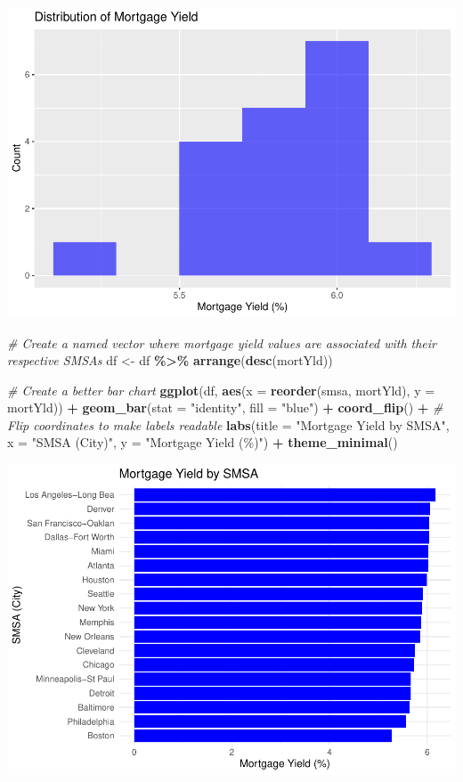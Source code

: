 \documentclass[
  12pt,
]{article}
\newenvironment{Shaded}{\begin{snugshade}}{\end{snugshade}}
\newcommand{\AttributeTok}[1]{\textcolor[rgb]{0.13,0.29,0.53}{#1}}
\newcommand{\CommentTok}[1]{\textcolor[rgb]{0.56,0.35,0.01}{\textit{#1}}}
\newcommand{\FunctionTok}[1]{\textcolor[rgb]{0.13,0.29,0.53}{\textbf{#1}}}
\newcommand{\NormalTok}[1]{#1}
\newcommand{\OtherTok}[1]{\textcolor[rgb]{0.56,0.35,0.01}{#1}}
\newcommand{\SpecialCharTok}[1]{\textcolor[rgb]{0.81,0.36,0.00}{\textbf{#1}}}
\newcommand{\StringTok}[1]{\textcolor[rgb]{0.31,0.60,0.02}{#1}}
\begin{document}
\includegraphics{report1_r1_files/figure-latex/unnamed-chunk-4-1.pdf}

\begin{Shaded}
\begin{Highlighting}[]
\CommentTok{\# Create a named vector where mortgage yield values are associated with their respective SMSAs}
\NormalTok{df }\OtherTok{\textless{}{-}}\NormalTok{ df }\SpecialCharTok{\%\textgreater{}\%} \FunctionTok{arrange}\NormalTok{(}\FunctionTok{desc}\NormalTok{(mortYld))  }

\CommentTok{\# Create a better bar chart}
\FunctionTok{ggplot}\NormalTok{(df, }\FunctionTok{aes}\NormalTok{(}\AttributeTok{x =} \FunctionTok{reorder}\NormalTok{(smsa, mortYld), }\AttributeTok{y =}\NormalTok{ mortYld)) }\SpecialCharTok{+} 
  \FunctionTok{geom\_bar}\NormalTok{(}\AttributeTok{stat =} \StringTok{"identity"}\NormalTok{, }\AttributeTok{fill =} \StringTok{"blue"}\NormalTok{) }\SpecialCharTok{+}
  \FunctionTok{coord\_flip}\NormalTok{() }\SpecialCharTok{+}  \CommentTok{\# Flip coordinates to make labels readable}
  \FunctionTok{labs}\NormalTok{(}\AttributeTok{title =} \StringTok{"Mortgage Yield by SMSA"}\NormalTok{, }\AttributeTok{x =} \StringTok{"SMSA (City)"}\NormalTok{, }\AttributeTok{y =} \StringTok{"Mortgage Yield (\%)"}\NormalTok{) }\SpecialCharTok{+}
  \FunctionTok{theme\_minimal}\NormalTok{()}
\end{Highlighting}
\end{Shaded}

\includegraphics{report1_r1_files/figure-latex/unnamed-chunk-4-2.pdf}
\end{document}

